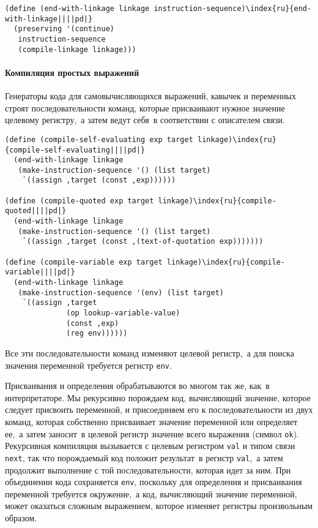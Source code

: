 \begin{Verbatim}[fontsize=\small]
(define (end-with-linkage linkage instruction-sequence)\index{ru}{end-with-linkage||||pd|}
  (preserving '(continue)
   instruction-sequence
   (compile-linkage linkage)))
\end{Verbatim}

\paragraph{Компиляция простых выражений}


Генераторы кода для самовычисляющихся выражений, кавычек
и переменных строят последовательности команд, которые присваивают
нужное значение целевому регистру,~а затем ведут себя~в соответствии с
описателем связи.

\begin{Verbatim}[fontsize=\small]
(define (compile-self-evaluating exp target linkage)\index{ru}{compile-self-evaluating||||pd|}
  (end-with-linkage linkage
   (make-instruction-sequence '() (list target)
    `((assign ,target (const ,exp))))))

(define (compile-quoted exp target linkage)\index{ru}{compile-quoted||||pd|}
  (end-with-linkage linkage
   (make-instruction-sequence '() (list target)
    `((assign ,target (const ,(text-of-quotation exp)))))))

(define (compile-variable exp target linkage)\index{ru}{compile-variable||||pd|}
  (end-with-linkage linkage
   (make-instruction-sequence '(env) (list target)
    `((assign ,target
              (op lookup-variable-value)
              (const ,exp)
              (reg env))))))
\end{Verbatim}
Все эти последовательности команд изменяют целевой регистр,~а для
поиска значения переменной требуется регистр {\tt env}.

  
Присваивания и определения обрабатываются во многом так
же, как~в интерпретаторе. Мы рекурсивно порождаем код, вычисляющий
значение, которое следует присвоить переменной, и присоединяем его к
последовательности из двух команд, которая собственно присваивает
значение переменной или определяет ее,~а затем заносит~в целевой
регистр значение всего выражения (символ {\tt ok}).
Рекурсивная компиляция вызывается с целевым регистром
{\tt val} и типом связи {\tt next}, так что порождаемый
код положит результат~в регистр {\tt val},~а затем продолжит
выполнение с той последовательности, которая идет за ним.  При
объединении кода сохраняется {\tt env}, поскольку для
определения и присваивания переменной требуется окружение,~а код,
вычисляющий значение переменной, может оказаться сложным выражением, которое
изменяет регистры произвольным образом.

